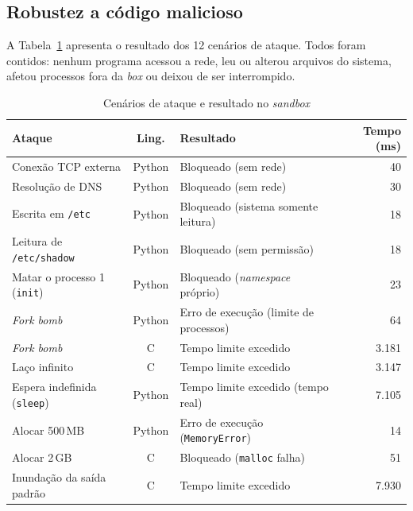 \documentclass[12pt]{article}
\begin{document}
\subsection{Robustez a código malicioso}

A Tabela~\ref{tab:ataques} apresenta o resultado dos 12 cenários de ataque. Todos foram contidos: nenhum programa acessou a rede, leu ou alterou arquivos do sistema, afetou processos fora da \emph{box} ou deixou de ser interrompido.

\begin{table}[!htb]
\centering
\caption{Cenários de ataque e resultado no \emph{sandbox}}
\label{tab:ataques}
\small
\begin{tabular}{|l|c|l|r|}
\hline
\textbf{Ataque} & \textbf{Ling.} & \textbf{Resultado} & \textbf{Tempo} (ms) \\
\hline
Conexão TCP externa              & Python & Bloqueado (sem rede)                     & 40 \\
Resolução de DNS                 & Python & Bloqueado (sem rede)                     & 30 \\
Escrita em \texttt{/etc}         & Python & Bloqueado (sistema somente leitura)      & 18 \\
Leitura de \texttt{/etc/shadow}  & Python & Bloqueado (sem permissão)                & 18 \\
Matar o processo 1 (\texttt{init}) & Python & Bloqueado (\emph{namespace} próprio)   & 23 \\
\emph{Fork bomb}                 & Python & Erro de execução (limite de processos)   & 64 \\
\emph{Fork bomb}                 & C      & Tempo limite excedido                    & 3.181 \\
Laço infinito                    & C      & Tempo limite excedido                    & 3.147 \\
Espera indefinida (\texttt{sleep}) & Python & Tempo limite excedido (tempo real)     & 7.105 \\
Alocar 500\,MB                   & Python & Erro de execução (\texttt{MemoryError})  & 14 \\
Alocar 2\,GB                     & C      & Bloqueado (\texttt{malloc} falha)        & 51 \\
Inundação da saída padrão        & C      & Tempo limite excedido                    & 7.930 \\
\hline
\end{tabular}
\end{table}
\end{document}
